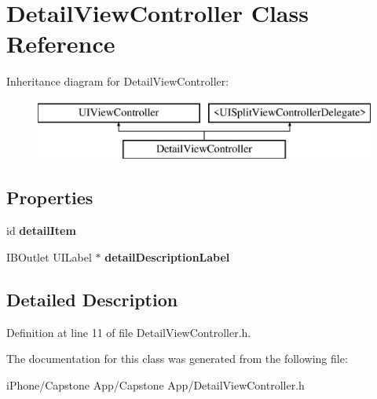 \hypertarget{interface_detail_view_controller}{\section{Detail\-View\-Controller Class Reference}
\label{interface_detail_view_controller}
}
Inheritance diagram for Detail\-View\-Controller\-:\begin{figure}[H]
\begin{center}
\leavevmode
\includegraphics[height=2.000000cm]{interface_detail_view_controller}
\end{center}
\end{figure}
\subsection*{Properties}
\begin{DoxyCompactItemize}
\item 
\hypertarget{interface_detail_view_controller_a41ae1396cedaed2483ef393ee9dca6fb}{id {\bfseries detail\-Item}}\label{interface_detail_view_controller_a41ae1396cedaed2483ef393ee9dca6fb}

\item 
\hypertarget{interface_detail_view_controller_a1504b315f71021c7e20ff327f03b4c62}{I\-B\-Outlet U\-I\-Label $\ast$ {\bfseries detail\-Description\-Label}}\label{interface_detail_view_controller_a1504b315f71021c7e20ff327f03b4c62}

\end{DoxyCompactItemize}


\subsection{Detailed Description}


Definition at line 11 of file Detail\-View\-Controller.\-h.



The documentation for this class was generated from the following file\-:\begin{DoxyCompactItemize}
\item 
i\-Phone/\-Capstone App/\-Capstone App/Detail\-View\-Controller.\-h\end{DoxyCompactItemize}
